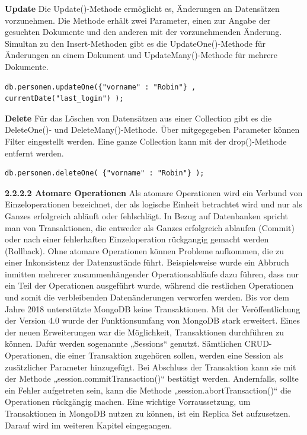 \textbf{Update}
\newline
Die Update()-Methode ermöglicht es, Änderungen an Datensätzen vorzunehmen.  Die Methode erhält zwei Parameter, einen zur Angabe der gesuchten Dokumente und den anderen mit  der vorzunehmenden Änderung. Simultan zu den Insert-Methoden gibt es die UpdateOne()-Methode für Änderungen an einem Dokument und UpdateMany()-Methode für mehrere Dokumente.
\newline

\begin{lstlisting}[caption=MongoDB Update, label=lst:MongoDBUpdate]
db.personen.updateOne({"vorname" : "Robin"} , currentDate("last_login") );

\end{lstlisting}

\textbf{Delete}
\newline
Für das Löschen von Datensätzen aus einer Collection gibt es die DeleteOne()- und DeleteMany()-Methode. Über mitgegegeben Parameter können Filter eingestellt werden. Eine ganze Collection kann mit der drop()-Methode entfernt werden.
\newline

\begin{lstlisting}[caption=MongoDB Remove, label=lst:MongoDBRemove]
db.personen.deleteOne( {"vorname" : "Robin"} );

\end{lstlisting}

\textbf{2.2.2.2 Atomare Operationen}
\newline
Als atomare Operationen wird ein Verbund von Einzeloperationen bezeichnet, der als logische Einheit betrachtet wird und nur als Ganzes erfolgreich abläuft oder fehlschlägt. In Bezug auf Datenbanken spricht man von Transaktionen, die entweder als Ganzes erfolgreich ablaufen (Commit) oder nach einer fehlerhaften Einzeloperation rückgangig gemacht werden (Rollback). Ohne atomare Operationen können Probleme aufkommen, die zu einer Inkonsistenz der Datenzustände führt. Beispielsweise wurde ein Abbruch inmitten mehrerer zusammenhängender Operationsabläufe dazu führen,  dass nur ein Teil der Operationen ausgeführt wurde, während die restlichen Operationen und somit die verbleibenden Datenänderungen verworfen werden.
\newline
Bis vor dem Jahre 2018 unterstützte MongoDB keine Transaktionen. Mit der Veröffentlichung der Version 4.0 wurde der Funktionsumfang von MongoDB stark erweitert. Eines der neuen Erweiterungen war die Möglichkeit, Transaktionen durchführen zu können. Dafür werden sogenannte „Sessions“ genutzt. Sämtlichen CRUD-Operationen, die einer Transaktion zugehören sollen, werden eine Session als zusätzlicher Parameter hinzugefügt.  Bei Abschluss der Transaktion kann sie mit der Methode „session.commitTransaction()“ bestätigt werden. Andernfalls, sollte ein Fehler aufgetreten sein, kann die Methode „session.abortTransaction()“ die Operationen rückgängig machen. Eine wichtige Vorraussetzung, um Transaktionen in MongoDB nutzen zu können, ist ein Replica Set aufzusetzen. Darauf wird im weiteren Kapitel eingegangen. 
\newline

